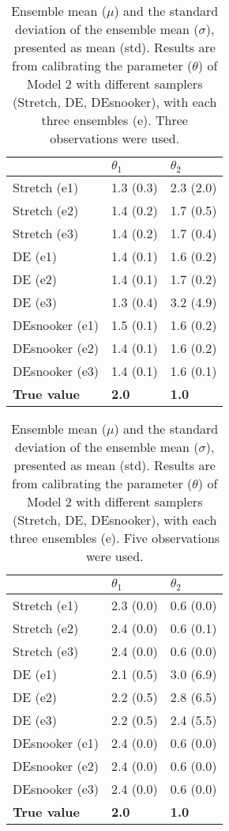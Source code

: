 \begin{table}[ht]
\caption{Ensemble mean ($\mu$) and the standard deviation of the ensemble mean ($\sigma$), presented as mean (std). Results are from calibrating the parameter ($\theta$) of Model 2 with different samplers (Stretch, DE, DEsnooker), with each three ensembles (e). Three observations were used.}
\label{tab_logbook8_obs3_model2}
\begin{tabularx}{\textwidth}{XXX}
\toprule
 & $\theta_1$  & $\theta_2$ \\
\midrule
Stretch (e1) & 1.3 (0.3) & 2.3 (2.0) \\
Stretch (e2) & 1.4 (0.2) & 1.7 (0.5) \\
Stretch (e3) & 1.4 (0.2) & 1.7 (0.4) \\
\midrule
DE (e1) & 1.4 (0.1) & 1.6 (0.2) \\
DE (e2) & 1.4 (0.1) & 1.7 (0.2) \\
DE (e3) & 1.3 (0.4) & 3.2 (4.9) \\
\midrule
DEsnooker (e1) & 1.5 (0.1) & 1.6 (0.2) \\
DEsnooker (e2) & 1.4 (0.1) & 1.6 (0.2) \\
DEsnooker (e3) & 1.4 (0.1) & 1.6 (0.1) \\
\midrule
\textbf{True value} & \textbf{2.0} & \textbf{1.0}\\
\bottomrule
\end{tabularx}
\end{table}


\begin{table}[ht]
\caption{Ensemble mean ($\mu$) and the standard deviation of the ensemble mean ($\sigma$), presented as mean (std). Results are from calibrating the parameter ($\theta$) of Model 2 with different samplers (Stretch, DE, DEsnooker), with each three ensembles (e). Five observations were used.}
\label{tab_logbook8_obs5_model2}
\begin{tabularx}{\textwidth}{XXX}
\toprule
 & $\theta_1$  & $\theta_2$ \\
\midrule
Stretch (e1) & 2.3 (0.0) & 0.6 (0.0) \\
Stretch (e2) & 2.4 (0.0) & 0.6 (0.1) \\
Stretch (e3) & 2.4 (0.0) & 0.6 (0.0) \\
\midrule
DE (e1) & 2.1 (0.5) & 3.0 (6.9) \\
DE (e2) & 2.2 (0.5) & 2.8 (6.5) \\
DE (e3) & 2.2 (0.5) & 2.4 (5.5) \\
\midrule
DEsnooker (e1) & 2.4 (0.0) & 0.6 (0.0) \\
DEsnooker (e2) & 2.4 (0.0) & 0.6 (0.0) \\
DEsnooker (e3) & 2.4 (0.0) & 0.6 (0.0) \\
\midrule
\textbf{True value} & \textbf{2.0} & \textbf{1.0}\\
\bottomrule
\end{tabularx}
\end{table}
\clearpage



